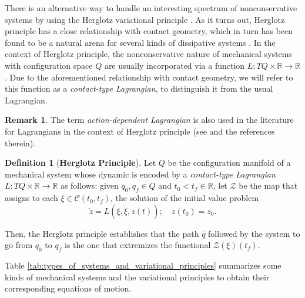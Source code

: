 \documentclass{aims}
\numberwithin{equation}{section}
\theoremstyle{definition}
\newtheorem{definition}[theorem]{Definition}
\newtheorem{remark}[theorem]{Remark}
\begin{document}
There is an alternative way to handle an interesting spectrum of nonconservative systems by using the Herglotz variational principle \cite{ Georgieva2011Herglotz, ZHANG2019691}. As it turns out, Herglotz principle has a close relationship with contact geometry, which in turn has been found to be a natural arena for several kinds of dissipative systems \cite{de2019contact, Bravetti2017contact, Georgieva2011Herglotz, Bravetti2019Contact-thermodynamics, Bravetti2015Contact-symmetry-thermodynamics, Bravetti2017Contact-Hamiltonian}. In the context of Herglotz principle, the nonconservative nature of mechanical systems with configuration space $Q$ are usually incorporated via a function $L\colon TQ\times \mathbb{R}\to\mathbb{R}$. Due to the aforementioned relationship with contact geometry, we will refer to this function as a {\it contact-type Lagrangian}, to distinguish it from the usual Lagrangian.

\begin{remark}
The term {\it action-dependent Lagrangian} is also used in the literature for Lagrangians in the context of Herglotz principle (see \cite{lazo2018action, de2020review, lopez2022nonsmooth} and the references therein).
\end{remark}

\begin{definition}[{\bf Herglotz Principle}]\label{Herglotz-Principle}
Let $Q$ be the configuration manifold of a mechanical system whose dynamic is encoded by a {{\it contact-type Lagrangian}} $L\colon TQ\times \mathbb{R}\to \mathbb{R}$ as follows: given $q_0, q_f\in Q$ and $t_0< t_f\in \mathbb{R}$, let ${\mathcal Z}$ be the map that assigns to each $\xi\in {\mathcal C}(t_0, t_f)$, the solution of the initial value problem
\begin{equation}\label{Herglotz-principle}
    \dot{z} = L(\xi, \dot{\xi}, z(t));\quad z(t_0) = z_0.
\end{equation}

\noindent Then, the Herglotz principle establishes that the path $\overline{q}$ followed by the system to go from $q_0$ to $q_f$ is the one that extremizes the functional ${\mathcal Z}(\xi)(t_f)$.
\end{definition}

Table \ref{tab:types_of_systems_and_variational_principles} summarizes some kinds of mechanical systems and the variational principles to obtain their corresponding equations of motion.
\end{document}
